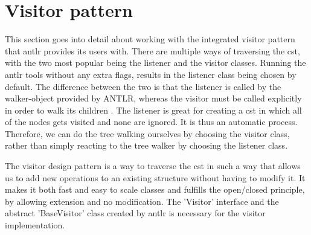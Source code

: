 \section{Visitor pattern}\label{sec:visitorpattern}

This section goes into detail about working with the integrated visitor pattern that \gls{antlr} provides its users with. There are multiple ways of traversing the \gls{cst}, with the two most popular being the listener and the visitor classes. Running the \gls{antlr} tools without any extra flags, results in the listener class being chosen by default. The difference between the two is that the listener is called by the walker-object provided by ANTLR, whereas the visitor must be called explicitly in order to walk its children \cite{Parr2014}. The listener is great for creating a \gls{cst} in which all of the nodes gets visited and none are ignored. It is thus an automatic process. Therefore, we can do the tree walking ourselves by choosing the visitor class, rather than simply reacting to the tree walker by choosing the listener class.

The visitor design pattern is a way to traverse the \gls{cst} in such a way that allows us to add new operations to an existing structure without having to modify it. It makes it both fast and easy to scale classes and fulfills the open/closed principle, by allowing extension and no modification. The 'Visitor' interface and the abstract 'BaseVisitor' class created by \gls{antlr} is necessary for the visitor implementation.

